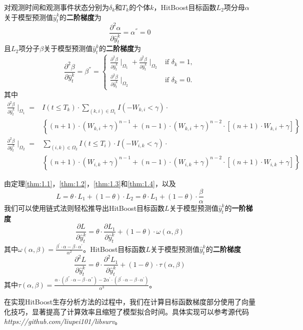 \begin{theorem}\label{thm:1.4}
对观测时间和观测事件状态分别为$\delta_k$和$T_k$的个体$k$，HitBoost目标函数$L_2$项分母$\alpha$关于模型预测值$\hat{y}_t^k$的\textbf{二阶梯度}为$$
\frac{\partial^2 \alpha}{\partial \hat{y}_t^k}=\alpha^{''}=0
$$ 且$L_2$项分子$\beta$关于模型预测值$\hat{y}_t^k$的\textbf{二阶梯度}为$$
\frac{\partial^2 \beta}{\partial \hat{y}_t^k}=\beta^{''}=
\begin{cases}
\frac{\partial^2 \beta}{\partial \hat{y}_t^k} \mid_{\Omega_1} + \frac{\partial^2 \beta}{\partial \hat{y}_t^k} \mid_{\Omega_2} & \text{if } \delta_k = 1,\\
\frac{\partial^2 \beta}{\partial \hat{y}_t^k} \mid_{\Omega_2} & \text{if } \delta_k = 0.
\end{cases}
$$ 其中\[
\begin{split}
\frac{\partial^2 \beta}{\partial \hat{y}_t^k} \mid_{\Omega_1} =& I(t\le T_k)\cdot \sum\limits_{(k,i)\in \Omega_1} I(-W_{k,i}<\gamma)\cdot \\
  & \left\{(n+1)\cdot (W_{k,i}+\gamma)^{n-1} + (n-1)\cdot (W_{k,i}+\gamma)^{n-2}\cdot [(n+1)\cdot W_{k,i}+\gamma]\right\} \\
\frac{\partial^2 \beta}{\partial \hat{y}_t^k} \mid_{\Omega_2} =& \sum\limits_{(i,k)\in \Omega_2} I(t\le T_i)\cdot I(-W_{i,k}<\gamma)\cdot \\
  & \left\{(n+1)\cdot (W_{i,k}+\gamma)^{n-1} + (n-1)\cdot (W_{i,k}+\gamma)^{n-2}\cdot [(n+1)\cdot W_{i,k}+\gamma]\right\}
\end{split}
\]
\end{theorem}

由定理\ref{thm:1.1}，\ref{thm:1.2}，\ref{thm:1.3}和\ref{thm:1.4}，以及$$
L=\theta\cdot L_1 + (1-\theta)\cdot L_2= \theta\cdot L_1 + (1-\theta)\cdot \frac{\beta}{\alpha}
$$ 我们可以使用链式法则轻松推导出HitBoost目标函数$L$关于模型预测值$\hat{y}_t^k$的\textbf{一阶梯度}$$
\frac{\partial L}{\partial \hat{y}_t^k}=\theta\cdot \frac{\partial L_1}{\partial \hat{y}_t^k} + (1-\theta)\cdot \omega(\alpha, \beta)
$$ 其中$\omega(\alpha, \beta)=\frac{\beta^{'}\cdot \alpha - \beta\cdot \alpha^{'}}{\alpha^2}$。HitBoost目标函数$L$关于模型预测值$\hat{y}_t^k$的\textbf{二阶梯度}$$
\frac{\partial^2 L}{\partial \hat{y}_t^k}=\theta\cdot \frac{\partial^2 L_1}{\partial \hat{y}_t^k} + (1-\theta)\cdot \tau(\alpha, \beta)
$$ 其中$\tau(\alpha, \beta)=\frac{\alpha\cdot (\beta^{''}\cdot \alpha - \beta\cdot \alpha^{''})-2\alpha^{'}\cdot (\beta^{'}\cdot \alpha - \beta\cdot \alpha^{'})}{\alpha^3}$。

在实现HitBoost生存分析方法的过程中，我们在计算目标函数梯度部分使用了向量化技巧，显著提高了计算效率且缩短了模型拟合时间。具体实现可以参考源代码\emph{https://github.com/liupei101/libsurv}。

